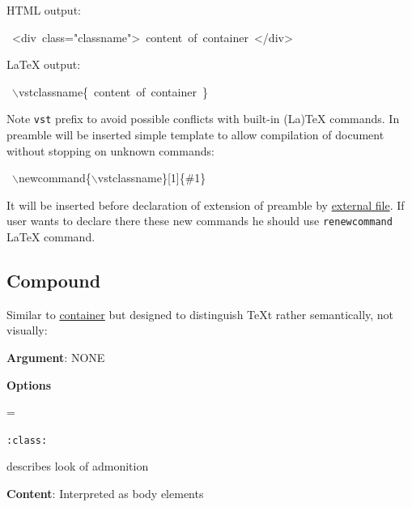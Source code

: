 \documentclass[12pt]{article}
\newenvironment{deflist}[1]{%
\begin{list}{}
{\renewcommand{\makelabel}[1]{\textbf{##1}\hfill}
\settowidth{\labelwidth}{\textbf{#1}}
\leftmargin=\labelwidth
\advance \leftmargin\labelsep}}
{\end{list}}
\newcommand{\vstvstcompound}[1]{#1}
\begin{document}
HTML output:

\begin{ttfamily}\begin{flushleft}
\mbox{~<div~class="classname">~content~of~container~</div>}\\
\end{flushleft}\end{ttfamily}

\LaTeX{} output:

\begin{ttfamily}\begin{flushleft}
\mbox{~$\backslash$vstclassname\{~content~of~container~\}}\\
\end{flushleft}\end{ttfamily}

Note \texttt{vst} prefix to avoid possible conflicts with built-in (La)\TeX{}
commands. In preamble will be inserted simple template to allow compilation of
document without stopping on unknown commands:

\begin{ttfamily}\begin{flushleft}
\mbox{~$\backslash$newcommand\{$\backslash$vstclassname\}[1]\{\#1\}}\\
\end{flushleft}\end{ttfamily}

It will be inserted before declaration of extension of preamble by \href{\#lvtp}{external
file}. If user wants to declare there these new commands he should
use \texttt{renewcommand} \LaTeX{} command.

\hypertarget{lcompound}{}
\subsection{Compound}

Similar to \href{\#lcontainer}{container} but designed to distinguish \TeX{}t rather semantically, not
visually:

 \vstvstcompound{}
\begin{itemize}
\item
\textbf{Argument}: NONE

\item
\textbf{Options}

 \begin{deflist}{iii}

\item[ \texttt{:class:}]

describes look of admonition
\end{deflist}

\item
\textbf{Content}: Interpreted as body elements
\end{itemize}
\hypertarget{lclass}{}
\end{document}
